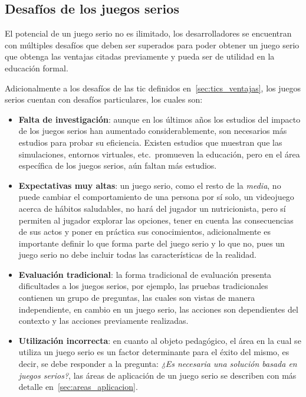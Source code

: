 \subsection{Desafíos de los juegos serios}

El potencial de un juego serio no es ilimitado, los desarrolladores se
encuentran con múltiples desafíos que deben ser superados para poder obtener un
juego serio que obtenga las ventajas citadas previamente y pueda ser de utilidad
en la educación formal.

Adicionalmente a los desafíos de las \Gls{tic} definidos
en~\ref{sec:tics_ventajas}, los juegos serios cuentan con desafíos particulares,
los cuales son:

\begin{itemize}

\item \textbf{Falta de investigación}: aunque en los últimos años los estudios
    del impacto de los juegos serios han aumentado considerablemente, son
    necesarios más estudios para probar su eficiencia\cite{sg:aoverview}.
    Existen estudios que muestran que las simulaciones, entornos virtuales,
    etc.\ promueven la educación, pero en el área específica de los juegos
    serios, aún faltan más estudios\cite{sg:aoverview}.

\item \textbf{Expectativas muy altas}: un juego serio, como el resto de la
    \textit{media}, no puede cambiar el comportamiento de una persona por sí
    solo, un videojuego acerca de hábitos saludables, no hará del jugador un
    nutricionista, pero sí permiten al jugador explorar las opciones, tener en
    cuenta las consecuencias de sus actos y poner en práctica sus
    conocimientos\cite{education:games}, adicionalmente es importante definir lo
    que forma parte del juego serio y lo que no, pues un juego serio no debe
    incluir todas las características de la
    realidad\cite{stapleton2004serious,videojuegos:gonzaleztardon}. 

\item \textbf{Evaluación tradicional}: la forma tradicional de evaluación presenta
    dificultades a los juegos serios, por ejemplo, las pruebas tradicionales
    contienen un grupo de preguntas, las cuales son vistas de manera
    independiente, en cambio en un juego serio, las acciones son dependientes
    del contexto y las acciones previamente realizadas\cite{shute2009melding}.

\item \textbf{Utilización incorrecta}: en cuanto al objeto pedagógico, el área en
    la cual se utiliza un juego serio es un factor determinante para el éxito
    del mismo, es decir, se debe responder a la pregunta: \emph{¿Es necesaria
        una solución basada en juegos serios?}\cite{stapleton2004serious}, las
    áreas de aplicación de un juego serio se describen con más detalle
    en~\ref{sec:areas_aplicacion}.


\end{itemize}
